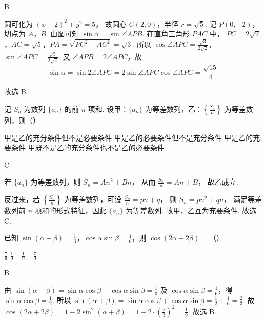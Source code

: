 \begin{answer}
B
\end{answer}

\begin{solution}
圆可化为
\((x-2)^2+y^2=5\)，
故圆心 \(C(2,0)\)，半径 \(r=\sqrt5\). 记 \(P(0,-2)\)，切点为 \(A\)，\(B\). 由图可知
\(\sin\alpha=\sin\angle APB\).
在直角三角形 \(PAC\) 中，
\(PC=2\sqrt2\)，\(AC=\sqrt5\)，\(PA=\sqrt{PC^2-AC^2}=\sqrt3\).
所以
\(\cos\angle APC=\frac{\sqrt3}{2\sqrt2}\)，\(\sin\angle APC=\frac{\sqrt5}{2\sqrt2}\).
又 \(\angle APB=2\angle APC\)，故
\[
\sin\alpha=\sin 2\angle APC=2\sin\angle APC\cos\angle APC=\frac{\sqrt{15}}{4}
\]


故选 B.
\end{solution}

\begin{problem}
记 \(S_n\) 为数列 \(\{a_n\}\) 的前 \(n\) 项和. 设甲：\(\{a_n\}\) 为等差数列，乙：\(\left\{\frac{S_n}{n}\right\}\) 为等差数列，则（\quad）

\choices
    {甲是乙的充分条件但不是必要条件}
    {甲是乙的必要条件但不是充分条件}
    {甲是乙的充要条件}
    {甲既不是乙的充分条件也不是乙的必要条件}
\end{problem}

\begin{answer}
C
\end{answer}

\begin{solution}
若 \(\{a_n\}\) 为等差数列，则
\(S_n=An^2+Bn\)，
从而
\(\frac{S_n}{n}=An+B\)，
故乙成立.

反过来，若 \(\left\{\frac{S_n}{n}\right\}\) 为等差数列，可设
\(\frac{S_n}{n}=pn+q\)，
则
\(S_n=pn^2+qn\)，
满足等差数列前 \(n\) 项和的形式特征，因此 \(\{a_n\}\) 为等差数列. 故甲，乙互为充要条件. 故选 C.
\end{solution}

\begin{problem}
已知 \(\sin(\alpha-\beta)=\frac13\)，\(\cos\alpha\sin\beta=\frac16\)，则 \(\cos(2\alpha+2\beta)=\)（\quad）

\choices
    {\(\frac79\)}
    {\(\frac19\)}
    {\(-\frac19\)}
    {\(-\frac79\)}
\end{problem}

\begin{answer}
B
\end{answer}

\begin{solution}
由
\(\sin(\alpha-\beta)=\sin\alpha\cos\beta-\cos\alpha\sin\beta=\frac13\)
及 \(\cos\alpha\sin\beta=\frac16\)，得
\(\sin\alpha\cos\beta=\frac12\).
所以
\(\sin(\alpha+\beta)=\sin\alpha\cos\beta+\cos\alpha\sin\beta=\frac12+\frac16=\frac23\).
故
\(\cos(2\alpha+2\beta)=1-2\sin^2(\alpha+\beta)=1-2\cdot\left(\frac23\right)^2=\frac19\).
故选 B.
\end{solution}
